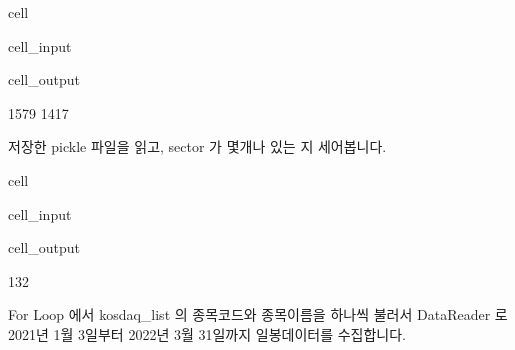 \documentclass[letterpaper,10pt,english]{jupyterBook}
\begin{document}
\begin{sphinxuseclass}{cell}
\begin{sphinxVerbatimInput}
\begin{sphinxuseclass}{cell_input}
\end{sphinxuseclass}\end{sphinxVerbatimInput}
\begin{sphinxVerbatimOutput}

\begin{sphinxuseclass}{cell_output}
\begin{sphinxVerbatim}[commandchars=\\\{\}]
1579
1417
\end{sphinxVerbatim}

\end{sphinxuseclass}\end{sphinxVerbatimOutput}

\end{sphinxuseclass}
\sphinxAtStartPar
 저장한 pickle 파일을 읽고, sector 가 몇개나 있는 지 세어봅니다.

\begin{sphinxuseclass}{cell}\begin{sphinxVerbatimInput}

\begin{sphinxuseclass}{cell_input}
\begin{sphinxVerbatim}[commandchars=\\\{\}]
  
\PYG{p}{[}\PYG{p}{]}
\end{sphinxVerbatim}

\end{sphinxuseclass}\end{sphinxVerbatimInput}
\begin{sphinxVerbatimOutput}

\begin{sphinxuseclass}{cell_output}
\begin{sphinxVerbatim}[commandchars=\\\{\}]
132
\end{sphinxVerbatim}

\end{sphinxuseclass}\end{sphinxVerbatimOutput}

\end{sphinxuseclass}
\sphinxAtStartPar
 For Loop 에서 kosdaq\_list 의 종목코드와 종목이름을 하나씩 불러서 DataReader 로 2021년 1월 3일부터 2022년 3월 31일까지 일봉데이터를 수집합니다.
\end{document}
